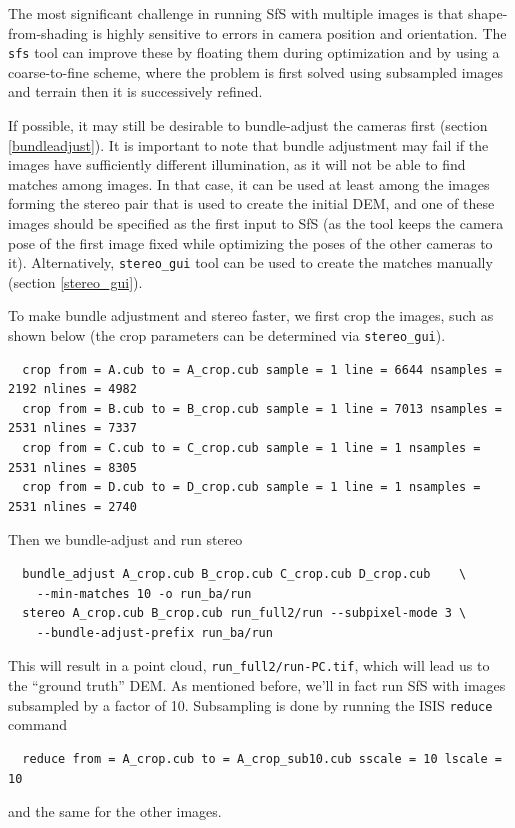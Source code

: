 The most significant challenge in running SfS with multiple images is
that shape-from-shading is highly sensitive to errors in camera position
and orientation. The \texttt{sfs} tool can improve these by floating
them during optimization and by using a coarse-to-fine scheme, where
the problem is first solved using subsampled images and terrain then
it is successively refined.

If possible, it may still be desirable to bundle-adjust the cameras first
(section \ref{bundleadjust}). It is important to note that bundle adjustment may
fail if the images have sufficiently different illumination, as it will
not be able to find matches among images. In that case, it can be used
at least among the images forming the stereo pair that is used to create
the initial DEM, and one of these images should be specified as the
first input to SfS (as the tool keeps the camera pose of the first image
fixed while optimizing the poses of the other cameras to
it). Alternatively, \texttt{stereo\_gui} tool can be used to create the
matches manually (section \ref{stereo_gui}).

To make bundle adjustment and stereo faster, we first crop the images,
such as shown below (the crop parameters can be determined via
\texttt{stereo\_gui}).
\begin{verbatim}
  crop from = A.cub to = A_crop.cub sample = 1 line = 6644 nsamples = 2192 nlines = 4982
  crop from = B.cub to = B_crop.cub sample = 1 line = 7013 nsamples = 2531 nlines = 7337
  crop from = C.cub to = C_crop.cub sample = 1 line = 1 nsamples = 2531 nlines = 8305
  crop from = D.cub to = D_crop.cub sample = 1 line = 1 nsamples = 2531 nlines = 2740
\end{verbatim}
Then we bundle-adjust and run stereo
\begin{verbatim}
  bundle_adjust A_crop.cub B_crop.cub C_crop.cub D_crop.cub    \
    --min-matches 10 -o run_ba/run
  stereo A_crop.cub B_crop.cub run_full2/run --subpixel-mode 3 \
    --bundle-adjust-prefix run_ba/run
\end{verbatim}

This will result in a point cloud, \verb#run_full2/run-PC.tif#, which will
lead us to the ``ground truth'' DEM. As mentioned
before, we'll in fact run SfS with images subsampled by a factor of
10. Subsampling is done by running the ISIS \texttt{reduce} command
\begin{verbatim}
  reduce from = A_crop.cub to = A_crop_sub10.cub sscale = 10 lscale = 10
\end{verbatim}
and the same for the other images.

